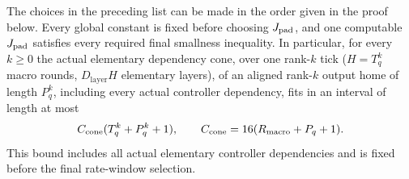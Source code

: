 \begin{lemma}\label{q1:l16}
The choices in the preceding list can be made in the order given in the proof below. Every global constant is fixed before choosing \(J_{\rm pad}\), and one computable \(J_{\rm pad}\) satisfies every required final smallness inequality. In particular, for every \(k\ge0\) the actual elementary dependency cone, over one rank-\(k\) tick (\(H=T_{q}^{k}\) macro rounds, \(D_{\mathrm{layer}}H\) elementary layers), of an aligned rank-\(k\) output home of length \(P_{q}^{k}\), including every actual controller dependency, fits in an interval of length at most
\[
 C_{\rm cone}(T_q^k+P_q^k+1),\qquad
 C_{\rm cone}=16(R_{\rm macro}+P_q+1).
\]
This bound includes all actual elementary controller dependencies and is fixed before the final rate-window selection.
\end{lemma}
